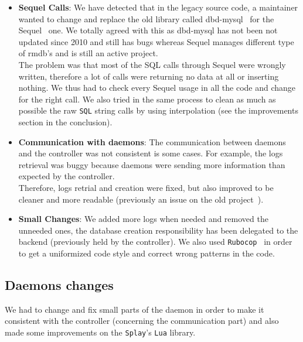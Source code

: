 \documentclass{eplmastersthesis}
\begin{document}
        \begin{itemize}
          \item \textbf{Sequel Calls}: We have detected that in the legacy
          source code, a maintainer wanted to change and replace the old library
          called dbd-mysql~\cite{dbdMysql} for the Sequel~\cite{Sequel} one. We
          totally agreed with this as dbd-mysql has not been not updated since
          2010 and still has bugs whereas Sequel manages different type of
          rmdb's and is still an active project.\\
          The problem was that most of the SQL calls through Sequel were wrongly
          written, therefore a lot of calls were returning no data at all or
          inserting nothing. We thus had to check every Sequel usage in all the
          code and change for the right call. We also tried in the same process
          to clean as much as possible the raw \texttt{SQL} string calls by using
          interpolation (see the improvements section in the conclusion).
          \item \textbf{Communication with daemons}: The communication between daemons
          and the controller was not consistent is some cases. For example, the
          logs retrieval was buggy because daemons were sending more
          information than expected by the controller.\\
          Therefore, logs retrial and creation were fixed, but
          also improved to be cleaner and more readable (previously an issue on
          the old project~\cite{logTimestamps}).
          \item \textbf{Small Changes}: We added more logs when needed and
          removed the unneeded ones, the database creation responsibility has
          been delegated to the backend (previously held by the controller). We
          also used \texttt{Rubocop}~\cite{Rubocop} in order to get a uniformized code
          style and correct wrong patterns in the code.
        \end{itemize}

      \subsection{Daemons changes}

        We had to change and fix small parts of the daemon in order to make
        it consistent with the controller (concerning the communication part)
        and also made some improvements on the \texttt{Splay}'s \texttt{Lua} library.
\end{document}
